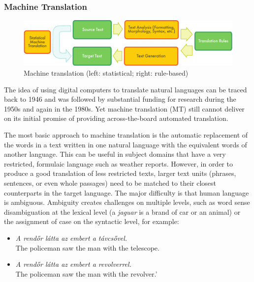 \begin{multicols}{2}
  \subsubsection{Machine Translation}

  \begin{figure}[htb]
    \center
    \includegraphics[width=\textwidth]{../_media/english/machine_translation}
    \caption{Machine translation (left: statistical; right: rule-based)}
    \label{fig:mtarch_en}
  \end{figure}

  The idea of using digital computers to translate natural languages can be traced back to 1946 and was followed by substantial funding for research during the 1950s and again in the 1980s. 
  Yet machine translation (MT) still cannot deliver on its initial promise of providing across-the-board automated translation.  


  The most basic approach to machine translation is the automatic replacement of the words in a text written in one natural language with the equivalent words of another language. This can be useful in subject domains that have a very restricted, formulaic language such as weather reports. However, in order to produce a good translation of less restricted texts, larger text units (phrases, sentences, or even whole passages) need to be matched to their closest counterparts in the target language. The major difficulty is that human language is ambiguous. Ambiguity creates challenges on multiple levels, such as word sense disambiguation at the lexical level (a \textit{jaguar} is a brand of car or an animal) or the assignment of case on the syntactic level, for example:

  \begin{itemize}
  \item \textit{A rendőr látta az embert a távcsővel.}\\
  The policeman saw the man with the telescope.
  \item \textit{A rendőr látta az embert a revolverrel.}\\
  The policeman saw the man with the revolver.'
  \end{itemize}


\end{multicols}
